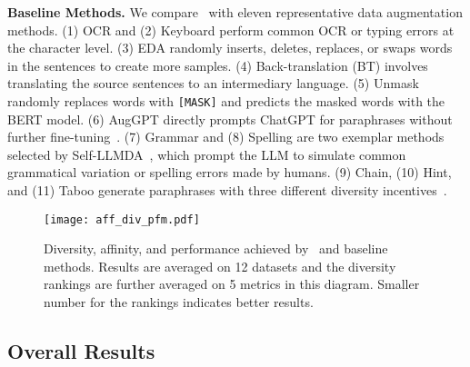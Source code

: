 \noindent\textbf{Baseline Methods.}
We compare \Methodnamec~with eleven representative data augmentation methods. 
(1) OCR and (2) Keyboard perform common OCR or typing errors at the character level. 
(3) EDA randomly inserts, deletes, replaces, or swaps words in the sentences to create more samples. 
(4) Back-translation (BT) involves translating the source sentences to an intermediary language. 
(5) Unmask randomly replaces words with \texttt{[MASK]} and predicts the masked words with the BERT model. 
(6) AugGPT directly prompts ChatGPT for paraphrases without further fine-tuning~\cite{dai2025auggpt}.
(7) Grammar and (8) Spelling are two exemplar methods selected by Self-LLMDA~\cite{li2024empowering}, which prompt the LLM to simulate common grammatical variation or spelling errors made by humans.
(9) Chain, (10) Hint, and (11) Taboo generate paraphrases with three different diversity incentives~\cite{cegin2024effects}.



\vspace{-2mm}

\begin{figure}[htbp]
    \centering
    \texttt{[image: aff\_div\_pfm.pdf]}
    \vspace{-2mm}
    \vspace{-3mm}
    \caption{Diversity, affinity, and performance achieved by \Methodnamec~and baseline methods. Results are averaged on 12 datasets and the diversity rankings are further averaged on 5  metrics in this diagram. Smaller number for the rankings indicates better results. }
    \label{fig:overall}
    \vspace{-4mm}
\end{figure}

\vspace{-2mm}
\subsection{Overall Results}
\vspace{-1mm}


